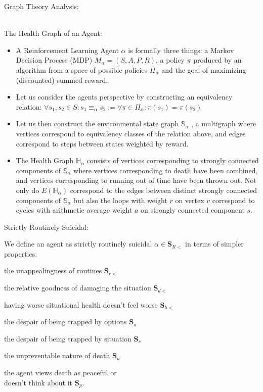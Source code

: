 \documentclass[12pt]{memoir}
\begin{document}
{\begin{HUGE} \centering Graph Theory Analysis:
\par \end{HUGE} }
\quad \\
{ \LARGE The Health Graph of an Agent: }
\begin{large}
\begin{itemize} 
\item A Reinforcement Learning Agent $\alpha$ is formally three things: a Markov Decision Process (MDP) $M_\alpha = (S, A, P, R) $, a policy $\pi$ produced by an algorithm from a space of possible policies $\Pi_\alpha$ and the goal of maximizing (discounted) summed reward.
\item Let us consider the agents perspective by constructing an equivalency relation: 
$\forall s_1, s_2 \in S: s_1 \equiv_\alpha s_2 := \forall \pi \in \Pi_\alpha : \pi(s_1) = \pi(s_2) $
\item Let us then construct the environmental state graph $\mathbb{S}_\alpha $ , a multigraph where vertices correspond to equivalency classes of the relation above, and edges correspond to steps between states weighted by reward.
\item The Health Graph $\mathbb{H}_\alpha$ consists of vertices corresponding to strongly connected components of $\mathbb{S}_\alpha$ where vertices corresponding to death have been combined, and vertices corresponding to running out of time have been thrown out. Not only do  $E(\mathbb{H}_\alpha)$ correspond to the edges between distinct strongly connected components of $\mathbb{S}_\alpha$ but also the loops with weight $r$ on vertex $v$ correspond to cycles with arithmetic average weight $a$ on strongly connected component $s$. 
\end{itemize} 
\end{large}
{ \LARGE Strictly Routinely Suicidal: }\\
\begin{large}We define an agent as strictly routinely suicidal $\alpha \in \mathbf{S}_{R<}$ in terms of simpler properties: 

\end{large}
\begin{itemize}
\begin{multicols}{3}
\item the unappealingness of routines $\mathbf{S}_{r<}$
\item the relative goodness of damaging the situation $\mathbf{S}_{d<}$
\item having worse situational health doesn’t feel worse $\mathbf{S}_{h<}$
\columnbreak 
\item the despair of being trapped by options $\mathbf{S}_o$
\item the despair of being trapped by situation $\mathbf{S}_s$ 
\item the unpreventable nature of death $\mathbf{S}_u$
\columnbreak
\item the agent views death as peaceful or\\ doesn’t think about it $ \mathbf{S}_p$.
\end{multicols}
\end{itemize}
\end{document}
